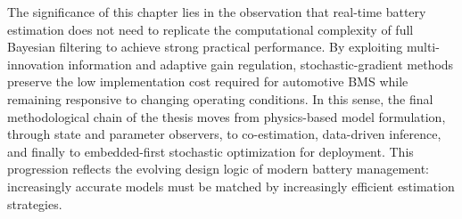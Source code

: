 The significance of this chapter lies in the observation that real-time battery estimation does not need to replicate the computational complexity of full Bayesian filtering to achieve strong practical performance. By exploiting multi-innovation information and adaptive gain regulation, stochastic-gradient methods preserve the low implementation cost required for automotive BMS while remaining responsive to changing operating conditions. In this sense, the final methodological chain of the thesis moves from physics-based model formulation, through state and parameter observers, to co-estimation, data-driven inference, and finally to embedded-first stochastic optimization for deployment. This progression reflects the evolving design logic of modern battery management: increasingly accurate models must be matched by increasingly efficient estimation strategies.
